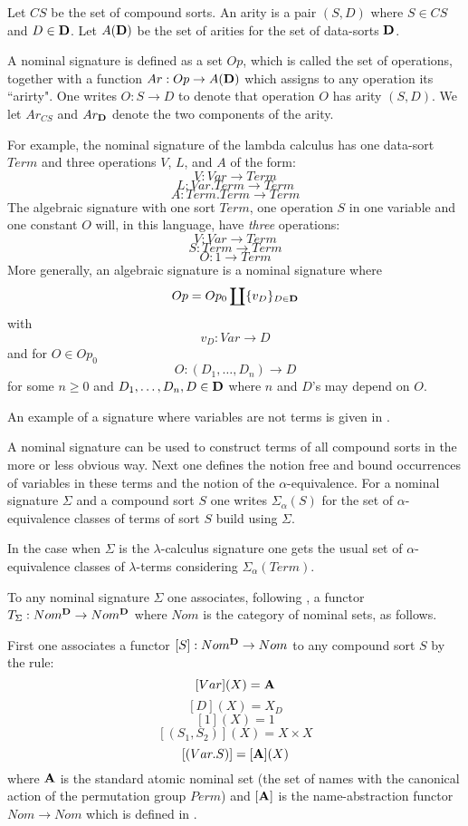 \documentclass[11pt]{article}
\newcommand{\sr}{\rightarrow}
\begin{document}
 Let $CS$ be the set of compound sorts. An arity is a pair $(S,D)$ where $S\in CS$ and $D\in {\bf D}$. Let $A({\bf D})$ be the set of arities for the set of data-sorts $\bf D$. 

A nominal signature is defined as a set $Op$, which is called the set of operations, together with a function  $Ar:Op\sr A({\bf D})$ which assigns to any operation its ``arirty". One writes $O:S\sr D$ to denote that operation $O$ has arity $(S,D)$. We let $Ar_{CS}$ and $Ar_{\bf D}$ denote the two components of the arity. 

For example, the nominal signature of the lambda calculus has one data-sort $Term$ and three operations $V$, $L$, and $A$  of the form:
%
$$V:Var\sr Term$$
$$L:Var.Term\sr Term$$
$$A:Term.Term\sr Term$$
%
The algebraic signature with one sort $Term$, one operation $S$ in one variable and one constant $O$ will, in this language, have {\em three}  operations:
%
$$V:Var\sr Term$$
$$S: Term\sr Term$$
$$O:1\sr Term$$
%
More generally, an algebraic signature is a nominal signature where 
%
$$Op=Op_0\coprod\{v_D\}_{D\in {\bf D}}$$
%
with 
%
$$v_D:Var\sr D$$
%
and for $O\in Op_0$
%
$$O:(D_1,\dots,D_n)\sr D$$
%
for some $n\ge 0$ and $D_1,\dots,D_n,D\in {\bf D}$ where $n$ and $D$'s may depend on $O$.  

An example of a signature where variables are not terms is given in \cite{Pitts}. 

A nominal signature can be used to construct terms of all compound sorts in the more or less obvious way. Next one defines the notion free and bound occurrences of variables in these terms and the notion of the  $\alpha$-equivalence. For a nominal signature $\Sigma$ and a compound sort $S$ one writes $\Sigma_{\alpha}(S)$ for the set of $\alpha$-equivalence classes of terms of sort $S$ build using $\Sigma$.

In the case when $\Sigma$ is the $\lambda$-calculus signature one gets the usual set of $\alpha$-equivalence classes of $\lambda$-terms considering $\Sigma_{\alpha}(Term)$. 

To any nominal signature $\Sigma$ one associates, following \cite{Pitts}, a functor $T_{\Sigma}:Nom^{\bf D}\sr Nom^{\bf D}$ where $Nom$ is the category of nominal sets, as follows.

First one associates a functor $[S]:Nom^{\bf D}\sr Nom$ to any compound sort $S$ by the rule:
%
$$[Var](X)={\bf A}$$
$$[D](X)=X_D$$
$$[1](X)=1$$
$$[(S_1,S_2)](X)=X\times X$$
$$[(Var.S)]=[{\bf A}](X)$$
%
where ${\bf A}$ is the standard atomic nominal set (the set of names with the canonical action of the permutation group $Perm$) and $[{\bf A}]$ is the name-abstraction functor $Nom\sr Nom$ which is defined in \cite[Section 4]{Pitts}. 
\end{document}
